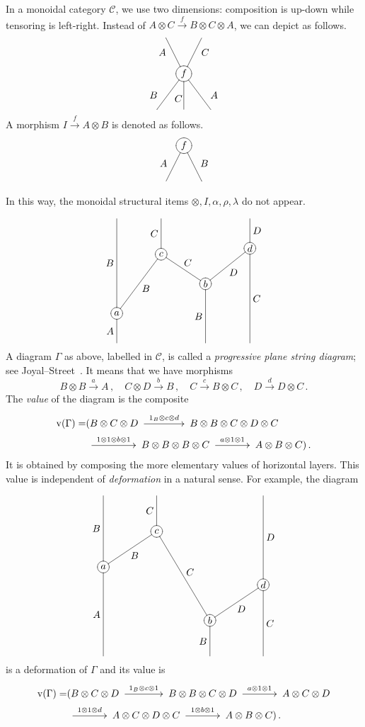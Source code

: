 \documentclass[a4paper,12pt]{article}
\makeatletter
\theoremstyle{definition}
\theoremstyle{fact}
\theoremstyle{genquest}
\theoremstyle{step}
\newcommand{\catC}{\mathcal{C}}
\newcommand{\val}{\operatorname{v}}
\newcommand{\longto}{\longrightarrow}
\newcommand{\xylongto}[2][2pt]{{\UseTips{}\xymatrix @C+#1{ \ar[r]^{#2}&}}}
\makeatother
\begin{document}
In a monoidal category $\catC$, we use two dimensions: composition is up-down while tensoring is left-right.
Instead of $A \otimes C \stackrel{f}{\longto} B \otimes C \otimes A$, we can depict as follows.   
\[ 
\xygraph{{f} *\xycircle<8pt>{-}="m" "m"(-[l(.5)u] [l(.1)d(.4)] {A},-[r(.5)u] [r(.1)d(.4)] {C},-[l(.75)d] [l(.1)u(.4)] {B},-[d] [l(.15)u(.3)] {C},-[r(.75)d] [r(.1)u(.4)] {A})} 
\]
A morphism $I \stackrel{f}{\longto}  A \otimes B$ is denoted as follows.
\[ 
\xygraph{!{0;(.5,0):(0,2)::}{f}*\xycircle<8pt>{-}="m" "m"(-[dl] [l(.15)u(.5)] {A},-[dr] [r(.15)u(.5)] {B})} 
\]
In this way, the monoidal structural items $\otimes, I, \alpha, \rho, \lambda$ do not appear.

\[ 
\xygraph{ !{/r2.5pc/:}
{a} *\xycircle<6pt>{-}="a" [u(2)r(1.5)] {c} *\xycircle<6pt>{-}="c" [d(1)r(1.5)] {b} *\xycircle<6pt>{-}="b" [r(1.5)u(1.2)] {d} *\xycircle<6pt>{-}="d" "a" (-[u(3.2)]^-*{B},-[d]_-*{A},-"c"_-*{B}(-[u(1.2)]^-*{C},-"b"^-*{C}(-[d(2)]_-*{B},-"d"_-*{D}(-[u]_-*{D},-[d(3.2)]^-*{C}))))} 
\]
A diagram $\Gamma$ as above, labelled in $\catC$, is called a \emph{progressive plane string diagram}; 
see Joyal--Street~\cite{GTC}.  
It means that we have morphisms
\[
B \otimes B \stackrel{a}{\longto} A\,, \quad
C \otimes D \stackrel{b}{\longto} B\,,\quad
C   \stackrel{c}{\longto} B \otimes C\,,\quad
D \stackrel{d}{\longto}  D \otimes C\,.  
\]
The \emph{value} of the diagram is the composite
%
\begin{align*}
 \val(\Gamma) =& (B \otimes C \otimes D \xylongto[16pt]{1_B\otimes c \otimes d} %
 B \otimes B \otimes C \otimes D \otimes C
\\
 & \xylongto[20pt]{1\otimes 1\otimes b \otimes 1} %
 B \otimes B \otimes B \otimes C   \xylongto[10pt]{a \otimes 1\otimes  1} %
 A \otimes B  \otimes C)\,.
\end{align*}
It is obtained by composing the more elementary values of horizontal layers. 
This value is independent of \emph{deformation} in a natural sense. 
For example, the diagram  

\[ 
\xygraph{{a} *\xycircle<6pt>{-}="a" [r(1.5)u] {c} *\xycircle<6pt>{-}="c" [r(1.5)d(2.5)] {b} *\xycircle<6pt>{-}="b" [r(1.5)u] {d} *\xycircle<6pt>{-}="d" "a" (-[u(2)]^-*{B},-[d(2.5)]_-*{A},-"c"_-*{B}(-[u]^-*{C},-"b"^-*{C}(-[d]_-*{B},-"d"_-*{D}(-[u(2.5)]_-*{D},-[d(2)]^-*{C}))))} 
\]
is a deformation of $\Gamma$ and its value is
\begin{align*}
\val(\Gamma) =& (B \otimes C \otimes D \xylongto[14pt]{1_B\otimes c \otimes 1} %
 B \otimes B \otimes C \otimes D \xylongto[10pt]{a \otimes 1 \otimes 1} %
 A \otimes C \otimes D
\\
 & \xylongto[10pt]{1\otimes 1\otimes d} %
  A \otimes C \otimes D \otimes C   \xylongto[10pt]{1 \otimes b \otimes  1} %
  A \otimes B  \otimes C)\,.
\end{align*}
\end{document}
